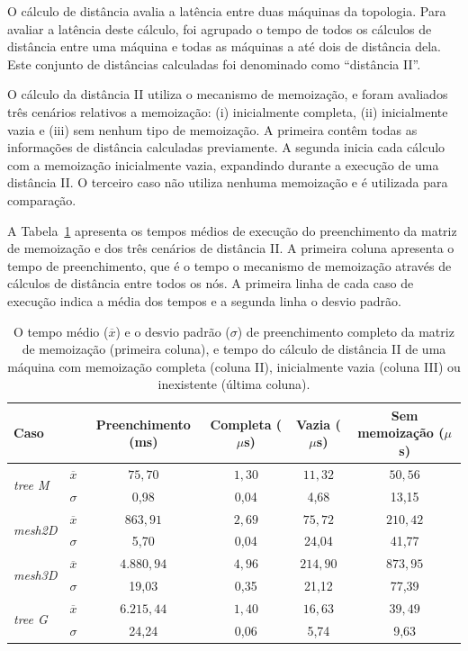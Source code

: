O cálculo de distância avalia a latência entre duas máquinas da topologia.
Para avaliar a latência deste cálculo, foi agrupado o tempo de todos os cálculos de distância entre uma máquina e todas as máquinas a até dois \hops de distância dela. 
Este conjunto de distâncias calculadas foi denominado como ``distância II''.

O cálculo da distância II utiliza o mecanismo de memoização, e foram avaliados três cenários relativos a memoização: (i) inicialmente completa, (ii) inicialmente vazia e (iii) sem nenhum tipo de memoização.
A primeira contêm todas as informações de distância calculadas previamente.
A segunda inicia cada cálculo com a memoização inicialmente vazia, expandindo durante a execução de uma distância II.
O terceiro caso não utiliza nenhuma memoização e é utilizada para comparação.

A Tabela~\ref{tab:dist_comparison} apresenta os tempos médios de execução do preenchimento da matriz de memoização e dos três cenários de distância II.
A primeira coluna apresenta o tempo de preenchimento, que é o tempo o mecanismo de memoização através de cálculos de distância entre todos os nós.
A primeira linha de cada caso de execução indica a média dos tempos e a segunda linha o desvio padrão.

\setlength{\tabcolsep}{0.5em}
\begin{table}[!ht]
    \centering
    \begin{tabular}{l c c c c c}
        \toprule
        \textbf{Caso} & &   \textbf{Preenchimento} (ms)  & \textbf{Completa} ($\mu$s) & \textbf{Vazia} ($\mu$s) & \textbf{Sem memoização} ($\mu$s)\\ \midrule
        \multirow{2}{*}{\textit{tree M}}  & $\overline{x}$   & $75,70$   & $1,30$     & $11,32$    & $50,56$  \\
        & $\sigma$ & 0,98 & 0,04 & 4,68 & 13,15 \\ \hline
        \multirow{2}{*}{\textit{mesh2D}}  & $\overline{x}$   & $863,91$  & $2,69$     & $75,72$    & $210,42$   \\
        & $\sigma$ & 5,70 & 0,04 & 24,04 & 41,77 \\ \hline
        \multirow{2}{*}{\textit{mesh3D}}  & $\overline{x}$   & $4.880,94$   & $4,96$      & $214,90$   & $873,95$   \\
        & $\sigma$ & 19,03 & 0,35 & 21,12 & 77,39 \\ \hline
        \multirow{2}{*}{\textit{tree G}}  & $\overline{x}$  & $6.215,44$ & $1,40$    & $16,63$    & $39,49$   \\
        & $\sigma$ & 24,24 & 0,06 & 5,74 & 9,63 \\ \bottomrule
    \end{tabular}
    \caption[Tempos de cálculo de distância da vizinhança II.]{O tempo médio ($\overline{x}$) e o desvio padrão ($\sigma$) de preenchimento completo da matriz de memoização (primeira coluna), e tempo do cálculo de distância II de uma máquina com memoização completa (coluna II), inicialmente vazia (coluna III) ou inexistente (última coluna).}
    \label{tab:dist_comparison}
\end{table}

